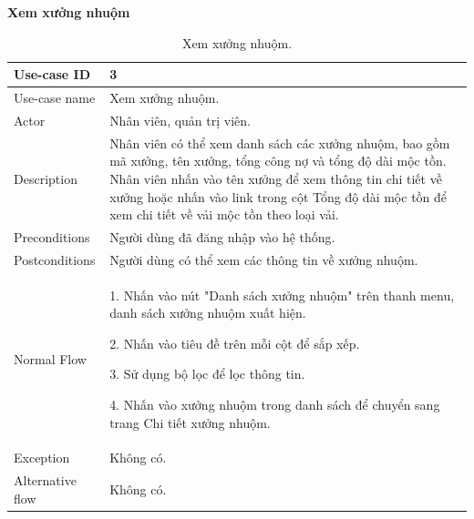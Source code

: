 \newpage
\textbf{Xem xưởng nhuộm}
\begin{table}[!htp]
    \centering
    \begin{tabular}{|m{3cm}|m{10cm}|}
    \hline 
        Use-case ID & 3\\ \hline
        Use-case name & Xem xưởng nhuộm.\\ \hline
        Actor & Nhân viên, quản trị viên.\\ \hline
        Description & Nhân viên có thể xem danh sách các xưởng nhuộm, bao gồm mã xưởng, tên xưởng, tổng công nợ và tổng độ dài mộc tồn. Nhân viên nhấn vào tên xưởng để xem thông tin chi tiết về xưởng hoặc nhấn vào link trong cột Tổng độ dài mộc tồn để xem chi tiết về vải mộc tồn theo loại vải.\\ \hline
        Preconditions & Người dùng đã đăng nhập vào hệ thống.\\ \hline
        Postconditions & Người dùng có thể xem các thông tin về xưởng nhuộm.\\ \hline
        Normal Flow & 
        1. Nhấn vào nút "Danh sách xưởng nhuộm" trên thanh menu, danh sách xưởng nhuộm xuất hiện.\par
        2. Nhấn vào tiêu đề trên mỗi cột để sắp xếp.\par
        3. Sử dụng bộ lọc để lọc thông tin.\par
        4. Nhấn vào xưởng nhuộm trong danh sách để chuyển sang trang Chi tiết xưởng nhuộm.\par
        \\ \hline
        Exception & Không có.\\ \hline
        Alternative flow & 
        Không có. \par
        \\ 
    \hline 
    \end{tabular}
    \caption{Xem xưởng nhuộm.}
    \label{bang3}
\end{table}

